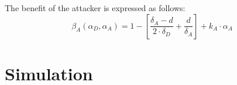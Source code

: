 The benefit of the attacker is expressed as follows:
\begin{equation}\label{first}
\beta_{A}(\alpha_{D},\alpha_{A}) = 1- [ \dfrac {\delta_{A} - d}{2 \cdot \delta_{D}} + \dfrac{d}{\delta_{A}}  ] + k_{A} \cdot \alpha_{A}
\end{equation}

\section{Simulation}


%
